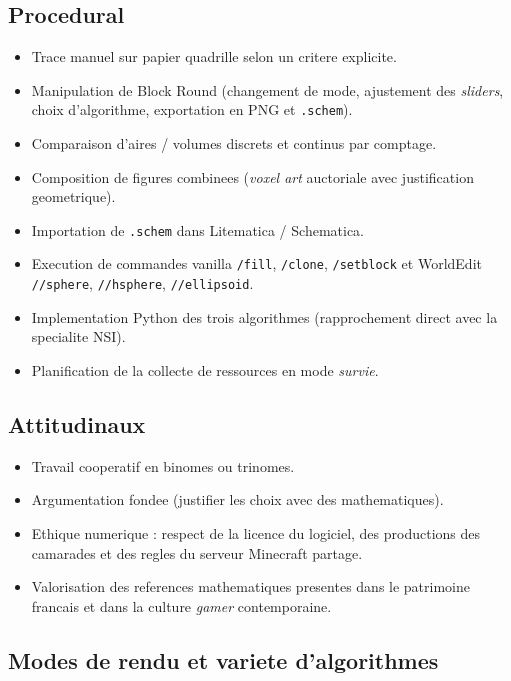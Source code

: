 \documentclass[12pt,a4paper]{scrartcl}
\newcommand{\cmd}[1]{\textcolor{earth}{\texttt{\small #1}}}
\begin{document}
\subsection{Procedural}
\begin{itemize}[leftmargin=1.3em,itemsep=0.15em,topsep=0.3em]
  \item Trace manuel sur papier quadrille selon un critere explicite.
  \item Manipulation de Block Round (changement de mode, ajustement des \emph{sliders}, choix d'algorithme, exportation en PNG et \texttt{.schem}).
  \item Comparaison d'aires / volumes discrets et continus par comptage.
  \item Composition de figures combinees (\emph{voxel art} auctoriale avec justification geometrique).
  \item Importation de \texttt{.schem} dans Litematica / Schematica.
  \item Execution de commandes vanilla \cmd{/fill}, \cmd{/clone}, \cmd{/setblock} et WorldEdit \cmd{//sphere}, \cmd{//hsphere}, \cmd{//ellipsoid}.
  \item Implementation Python des trois algorithmes (rapprochement direct avec la specialite NSI).
  \item Planification de la collecte de ressources en mode \emph{survie}.
\end{itemize}

\subsection{Attitudinaux}
\begin{itemize}[leftmargin=1.3em,itemsep=0.15em,topsep=0.3em]
  \item Travail cooperatif en binomes ou trinomes.
  \item Argumentation fondee (justifier les choix avec des mathematiques).
  \item Ethique numerique : respect de la licence du logiciel, des productions des camarades et des regles du serveur Minecraft partage.
  \item Valorisation des references mathematiques presentes dans le patrimoine francais et dans la culture \emph{gamer} contemporaine.
\end{itemize}

\subsection{Modes de rendu et variete d'algorithmes}
\end{document}
